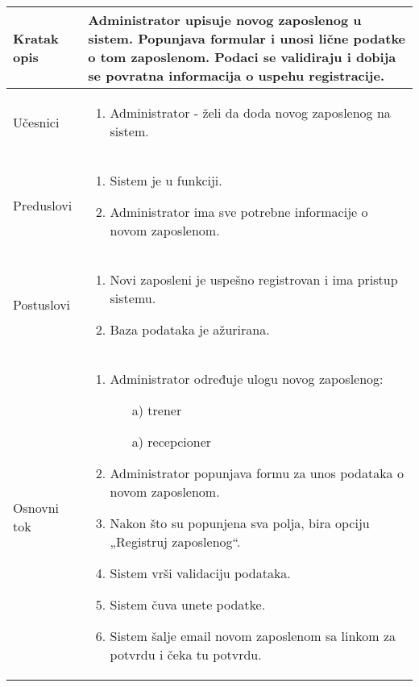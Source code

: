 \documentclass[../main.tex]{subfiles}
\begin{document}
\begin{longtable}{| p{} | p{} |} 

\hline
    Kratak opis &  Administrator upisuje novog zaposlenog u sistem. Popunjava formular i unosi lične podatke o tom zaposlenom. Podaci se validiraju i dobija se povratna informacija o uspehu registracije.\\ 
\hline    
    Učesnici & 
    	\begin{enumerate}
        \item Administrator - želi da doda novog zaposlenog na sistem.
     \end{enumerate}\\
\hline
   Preduslovi & \begin{enumerate}
       \item Sistem je u funkciji.
       \item Administrator ima sve potrebne informacije o novom zaposlenom.
   \end{enumerate}\\
\hline  
    Postuslovi & \begin{enumerate}
        \item Novi zaposleni je uspešno registrovan i ima pristup sistemu.
        \item Baza podataka je ažurirana.
    \end{enumerate}\\
\hline
    Osnovni tok & \begin{enumerate}
        \item Administrator određuje ulogu novog zaposlenog: 
            \begin{itemize}
                \item[a)] trener
                \item[a)] recepcioner
            \end{itemize}
        \item Administrator popunjava formu za unos podataka o novom zaposlenom.	
        \item Nakon što su popunjena sva polja, bira opciju „Registruj zaposlenog“.
        \item Sistem vrši validaciju podataka.
        \item Sistem čuva unete podatke.
        \item Sistem šalje email novom zaposlenom sa linkom za potvrdu i čeka tu potvrdu.

\end{enumerate}
\end{longtable}
\end{document}

